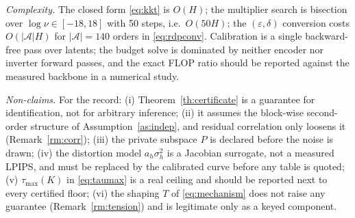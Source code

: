 \emph{Complexity.} The closed form \eqref{eq:kkt} is $O(H)$; the multiplier
search is bisection over $\log\nu\in[-18,18]$ with 50 steps, i.e.\ $O(50H)$;
the $(\varepsilon,\delta)$ conversion costs $O(|\mathcal A|H)$ for
$|\mathcal A|=140$ orders in \eqref{eq:rdpconv}. Calibration is a single
backward-free pass over latents; the budget solve is dominated by neither
encoder nor inverter forward passes, and the exact FLOP ratio should be
reported against the measured backbone in a numerical study.

\emph{Non-claims.} For the record: (i) Theorem~\ref{th:certificate} is a
guarantee for identification, not for arbitrary inference; (ii) it assumes the
block-wise second-order structure of Assumption~\ref{as:indep}, and residual
correlation only loosens it (Remark~\ref{rm:corr}); (iii) the private
subspace $P$ is declared before the noise is drawn; (iv) the distortion model
$a_h\sigma_h^{2}$ is a Jacobian surrogate, not a measured LPIPS, and must be
replaced by the calibrated curve before any table is quoted; (v)
$\tau_{\max}(K)$ in \eqref{eq:taumax} is a real ceiling and should be
reported next to every certified floor; (vi) the shaping $T$ of
\eqref{eq:mechanism} does not raise any guarantee (Remark~\ref{rm:tension}) and
is legitimate only as a keyed component.
